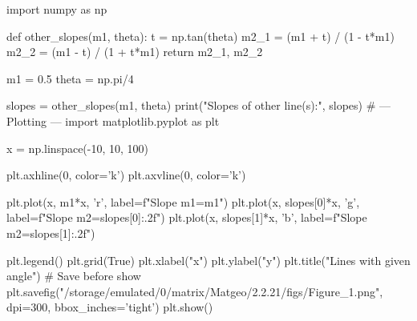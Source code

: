  import numpy as np

def other_slopes(m1, theta):
    t = np.tan(theta)
    m2_1 = (m1 + t) / (1 - t*m1)
    m2_2 = (m1 - t) / (1 + t*m1)
    return m2_1, m2_2

m1 = 0.5
theta = np.pi/4

slopes = other_slopes(m1, theta)
print("Slopes of other line(s):", slopes)
    # --- Plotting ---
import matplotlib.pyplot as plt

x = np.linspace(-10, 10, 100)

plt.axhline(0, color='k')
plt.axvline(0, color='k')

plt.plot(x, m1*x, 'r', label=f"Slope m1={m1}")
plt.plot(x, slopes[0]*x, 'g', label=f"Slope m2={slopes[0]:.2f}")
plt.plot(x, slopes[1]*x, 'b', label=f"Slope m2={slopes[1]:.2f}")

plt.legend()
plt.grid(True)
plt.xlabel("x")
plt.ylabel("y")
plt.title("Lines with given angle")
     # Save before show
plt.savefig("/storage/emulated/0/matrix/Matgeo/2.2.21/figs/Figure_1.png", dpi=300, bbox_inches='tight')
plt.show()   